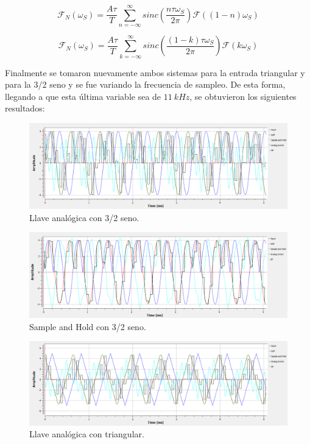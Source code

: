 \begin{equation*}
	\mathcal{F}_{N} \left( \omega_S \right) = \frac{A \tau}{T} \sum_{n=-\infty}^{\infty} sinc \left( \frac{n \tau \omega_S}{2 \pi} \right) \mathcal{F} \left( \left( 1 - n \right) \omega_S \right)
\end{equation*}

\begin{equation*}
	\mathcal{F}_{N} \left( \omega_S \right) = \frac{A \tau}{T} \sum_{k=-\infty}^{\infty} sinc \left( \frac{ \left( 1 - k \right) \tau \omega_S}{2 \pi} \right) \mathcal{F} \left( k \omega_S \right)
\end{equation*}

Finalmente se tomaron nuevamente ambos sistemas para la entrada triangular y para la 3/2 seno y se fue variando la frecuencia de sampleo. De esta forma, llegando a que esta última variable sea de $11 \ kHz$, se obtuvieron los siguientes resultados:
\begin{figure}[H]
\centering
	\includegraphics[width=0.8\linewidth]{ImagenesEjercicio6/6d-32LA11k.png}
	\caption{Llave analógica con 3/2 seno.}
	\label{fig:32la}
\end{figure}
\begin{figure}[H]
\centering
	\includegraphics[width=0.8\linewidth]{ImagenesEjercicio6/6d-32SH11k.png}
	\caption{Sample and Hold con 3/2 seno.}
	\label{fig:32sh}
\end{figure}
\begin{figure}[H]
\centering
	\includegraphics[width=0.8\linewidth]{ImagenesEjercicio6/6d-TRLA11k.png}
	\caption{Llave analógica con triangular.}
	\label{fig:trla}
\end{figure}
